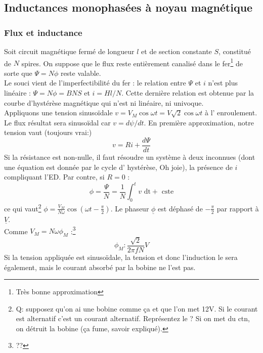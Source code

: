 		
		
	\subsection{Inductances monophasées à noyau magnétique}		
		\subsubsection{Flux et inductance}
		Soit circuit magnétique fermé de longueur $l$ et de section 
		constante $S$, constitué de $N$ spires. On suppose que le flux
		reste entièrement canalisé dans le fer\footnote{Très bonne 
		approximation} de sorte que $\Psi = N\phi$ reste valable.\\
		Le souci vient de l'imperfectibilité du fer : le relation entre 
		$\Psi$ et $i$ n'est plus linéaire : $\Psi = N\phi = BNS$ et 
		$i= H l/N$. Cette dernière relation est obtenue par la courbe 
		d'hystérèse magnétique qui n'est ni linéaire, ni univoque.\\
		
		Appliquons une tension sinusoïdale $v = V_M\cos\omega t = V
		\sqrt{2}\cos\omega t$ à l'	enroulement. Le flux résultat sera 
		sinusoïdal car $v = d\psi/dt$.	En première approximation, notre 
		tension vaut (toujours vrai:)
		\begin{equation}
		v = Ri + \frac{d\Psi}{dt}
		\end{equation}
		Si la résistance est non-nulle, il faut résoudre un système à 
		deux inconnues (dont une équation est donnée par le cycle d'
		hystérèse, Oh joie), la présence de $i$ compliquant l'ED. Par 
		contre, si $R=0$ :
		\begin{equation}
		\phi = \frac{\Psi}{N} = \frac{1}{N}\int_0^tv\text{ dt} + \text{ 
		cste}
		\end{equation}
		ce qui vaut\footnote{Q: supposez qu'on ai une bobine comme ça et 
		que l'on met 12V. Si le courant est alternatif c'est un courant 
		alternatif. Représentez le ? Si on met du ctn, on détruit la bobine 
		(ça fume, savoir expliqué).} $\phi = \frac{V_M}{N\omega}\cos\left(
		\omega t - \frac{\pi}{2}\right)$. Le phaseur $\underline{\phi}$ est 
		déphasé de $-\frac{\pi}{2}$ par rapport à $\underline{V}$.\\
		Comme $V_M = N\omega\phi_M$ :\footnote{??}
		\begin{equation}
		\phi_M : \dfrac{\sqrt{2}}{2\pi f N}V
		\end{equation}
		Si la tension appliquée est sinusoïdale, la tension et donc 
		l'induction le sera également, mais le courant absorbé par la 
		bobine ne l'est pas.
			
